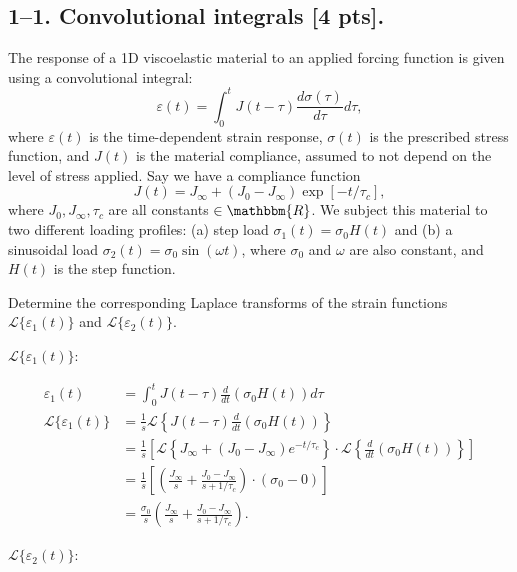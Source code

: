 \subsection*{1--1. \textbf{Convolutional integrals} [4 pts].}

The response of a 1D viscoelastic material to an applied forcing function is given using a convolutional integral:
\begin{equation}
    \varepsilon(t) = \int_0^t J(t-\tau) \frac{d\sigma(\tau)}{d\tau} d\tau,
\end{equation}
where $\varepsilon(t)$ is the time-dependent strain response, $\sigma(t)$ is the prescribed stress function, and $J(t)$ is the material compliance, assumed to not depend on the level of stress applied. 
Say we have a compliance function 
\begin{equation}
    J(t) = J_\infty + (J_0-J_\infty)\exp[-t/\tau_c],
\end{equation}
where $J_0, J_\infty, \tau_c$ are all constants $\in \mathbbm{R}$. 
We subject this material to two different loading profiles: (a) step load $\sigma_1(t) = \sigma_0 H(t)$ and (b) a sinusoidal load $\sigma_2(t) = \sigma_0  \sin(\omega t)$, where $\sigma_0$ and $\omega$ are also constant, and $H(t)$ is the step function. 

Determine the corresponding Laplace transforms of the strain functions $\mathcal{L}\{\varepsilon_1(t)\}$ and $\mathcal{L}\{\varepsilon_2(t)\}$.

$\mathcal{L}\{\varepsilon_1(t)\}$:

\begin{align*}
    \varepsilon_1 (t) &= \int_0^t J(t-\tau) \frac{d}{d t}(\sigma_0 H(t)) d\tau \\
    \mathcal{L}\{\varepsilon_1(t)\} &= \frac{1}{s} \mathcal{L} \left\{ J(t-\tau) \frac{d}{dt}(\sigma_0 H(t)) \right\} \\
    &= \frac{1}{s} \left[ \mathcal{L} \left\{ J_\infty + (J_0 - J_\infty) e^{-t/\tau_c}\right\}
    \cdot \mathcal{L} \left\{ \frac{d}{dt}(\sigma_0 H(t)) \right\}\right] \\
    &= \frac{1}{s} \left[ \left( \frac{J_\infty}{s} + \frac{J_0-J_\infty}{s+1/\tau_c} \right)
    \cdot (\sigma_0 - 0) \right] \\
    &= \boxed{\frac{\sigma_0}{s} \left( \frac{J_\infty}{s} + \frac{J_0-J_\infty}{s+1/\tau_c} \right).}
\end{align*}

$\mathcal{L}\{\varepsilon_2(t)\}$:

